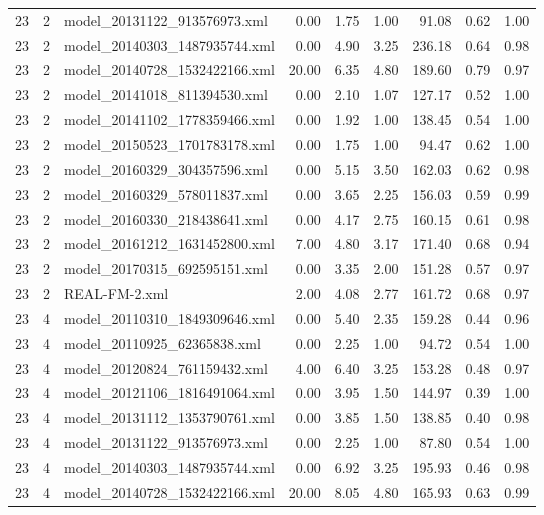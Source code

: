 \begin{table}[ht]
\begin{tabular}{rrlrrrrrr}
   23 &   2 & model\_20131122\_913576973.xml & 0.00 & 1.75 & 1.00 & 91.08 & 0.62 & 1.00 \\ 
   23 &   2 & model\_20140303\_1487935744.xml & 0.00 & 4.90 & 3.25 & 236.18 & 0.64 & 0.98 \\ 
   23 &   2 & model\_20140728\_1532422166.xml & 20.00 & 6.35 & 4.80 & 189.60 & 0.79 & 0.97 \\ 
   23 &   2 & model\_20141018\_811394530.xml & 0.00 & 2.10 & 1.07 & 127.17 & 0.52 & 1.00 \\ 
   23 &   2 & model\_20141102\_1778359466.xml & 0.00 & 1.92 & 1.00 & 138.45 & 0.54 & 1.00 \\ 
   23 &   2 & model\_20150523\_1701783178.xml & 0.00 & 1.75 & 1.00 & 94.47 & 0.62 & 1.00 \\ 
   23 &   2 & model\_20160329\_304357596.xml & 0.00 & 5.15 & 3.50 & 162.03 & 0.62 & 0.98 \\ 
   23 &   2 & model\_20160329\_578011837.xml & 0.00 & 3.65 & 2.25 & 156.03 & 0.59 & 0.99 \\ 
   23 &   2 & model\_20160330\_218438641.xml & 0.00 & 4.17 & 2.75 & 160.15 & 0.61 & 0.98 \\ 
   23 &   2 & model\_20161212\_1631452800.xml & 7.00 & 4.80 & 3.17 & 171.40 & 0.68 & 0.94 \\ 
   23 &   2 & model\_20170315\_692595151.xml & 0.00 & 3.35 & 2.00 & 151.28 & 0.57 & 0.97 \\ 
   23 &   2 & REAL-FM-2.xml & 2.00 & 4.08 & 2.77 & 161.72 & 0.68 & 0.97 \\ 
   23 &   4 & model\_20110310\_1849309646.xml & 0.00 & 5.40 & 2.35 & 159.28 & 0.44 & 0.96 \\ 
   23 &   4 & model\_20110925\_62365838.xml & 0.00 & 2.25 & 1.00 & 94.72 & 0.54 & 1.00 \\ 
   23 &   4 & model\_20120824\_761159432.xml & 4.00 & 6.40 & 3.25 & 153.28 & 0.48 & 0.97 \\ 
   23 &   4 & model\_20121106\_1816491064.xml & 0.00 & 3.95 & 1.50 & 144.97 & 0.39 & 1.00 \\ 
   23 &   4 & model\_20131112\_1353790761.xml & 0.00 & 3.85 & 1.50 & 138.85 & 0.40 & 0.98 \\ 
   23 &   4 & model\_20131122\_913576973.xml & 0.00 & 2.25 & 1.00 & 87.80 & 0.54 & 1.00 \\ 
   23 &   4 & model\_20140303\_1487935744.xml & 0.00 & 6.92 & 3.25 & 195.93 & 0.46 & 0.98 \\ 
   23 &   4 & model\_20140728\_1532422166.xml & 20.00 & 8.05 & 4.80 & 165.93 & 0.63 & 0.99 \\ 

\end{tabular}
\end{table}
